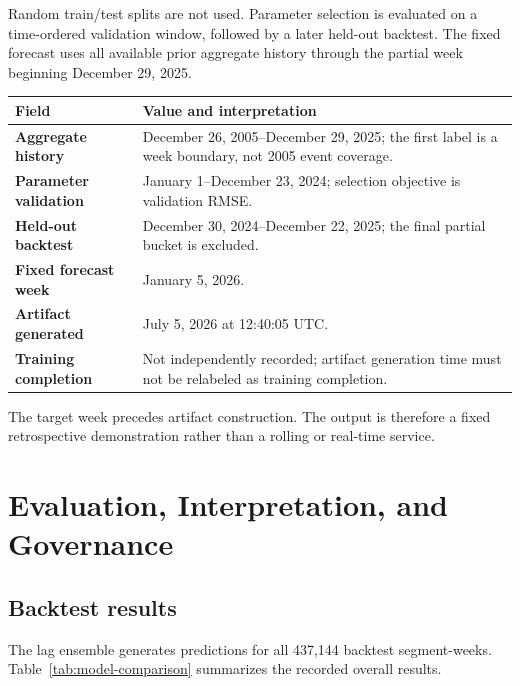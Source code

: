 \documentclass[11pt,oneside]{report}
\begin{document}
Random train/test splits are not used. Parameter selection is evaluated on a
time-ordered validation window, followed by a later held-out backtest. The
fixed forecast uses all available prior aggregate history through the partial
week beginning December 29, 2025.

\clearpage
\begin{center}
  \centering
  \captionsetup{hypcap=false}
  \label{tab:model-windows}
  \begin{tabularx}{\textwidth}{>{\bfseries}p{} Y}
    \toprule
    Field & Value and interpretation \\
    \midrule
    Aggregate history & December 26, 2005--December 29, 2025; the first label is a week boundary, not 2005 event coverage. \\
    Parameter validation & January 1--December 23, 2024; selection objective is validation RMSE. \\
    Held-out backtest & December 30, 2024--December 22, 2025; the final partial bucket is excluded. \\
    Fixed forecast week & January 5, 2026. \\
    Artifact generated & July 5, 2026 at 12:40:05 UTC. \\
    Training completion & Not independently recorded; artifact generation time must not be relabeled as training completion. \\
    \bottomrule
  \end{tabularx}
\end{center}

The target week precedes artifact construction. The output is therefore a
fixed retrospective demonstration rather than a rolling or real-time service.

\chapter{Evaluation, Interpretation, and Governance}

\section{Backtest results}

The lag ensemble generates predictions for all 437,144 backtest segment-weeks.
Table~\ref{tab:model-comparison} summarizes the recorded overall results.
\end{document}
